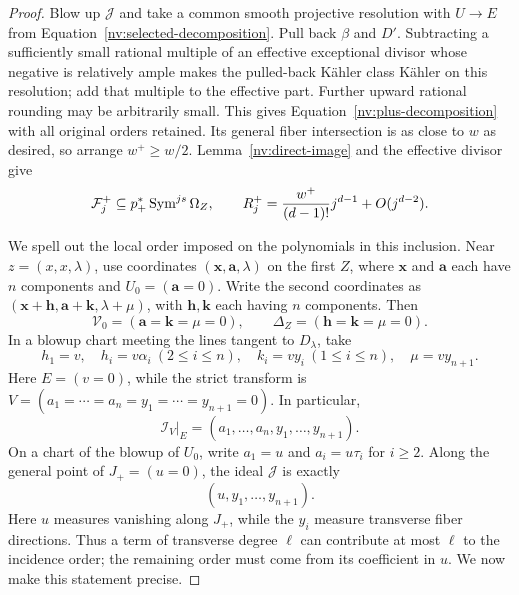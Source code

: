 \begin{proof}
Blow up \(\mathcal J\) and take a common smooth projective resolution
with \(U\to E\) from Equation~\eqref{nv:selected-decomposition}.  Pull back
\(\beta\) and \(D'\).  Subtracting a sufficiently small rational
multiple of an effective exceptional divisor whose negative is
relatively ample makes the pulled-back Kähler class Kähler on this
resolution; add that multiple to the effective part.  Further upward
rational rounding may be
arbitrarily small.  This gives Equation~\eqref{nv:plus-decomposition} with all
original orders retained.  Its general fiber intersection is as close
to \(w\) as desired, so arrange \(w^+\ge w/2\).  Lemma~\ref{nv:direct-image}
and the effective divisor give
\begin{equation}\label{nv:plus-rank}
 \mathcal F_j^+\subseteq p_+^*\operatorname{Sym}^{js}\Omega_Z,\qquad
 R_j^+=\frac{w^+}{(d-1)!}j^{d-1}+O(j^{d-2}).
\end{equation}

We spell out the local order imposed on the polynomials in this
inclusion.  Near \(z=(x,x,\lambda)\), use coordinates
\((\mathbf x,\mathbf a,\lambda)\) on the first \(Z\), where \(\mathbf x\)
and \(\mathbf a\) each have \(n\) components and \(U_0=(\mathbf a=0)\).
Write the second coordinates as
\((\mathbf x+\mathbf h,\mathbf a+\mathbf k,\lambda+\mu)\), with
\(\mathbf h,\mathbf k\) each having \(n\)
components.  Then
\[
 \mathcal V_0=(\mathbf a=\mathbf k=\mu=0),\qquad
 \Delta_Z=(\mathbf h=\mathbf k=\mu=0).
\]
In a blowup chart meeting the lines tangent to \(D_\lambda\), take
\[
 h_1=v,\quad h_i=v\alpha_i\ (2\le i\le n),\quad
 k_i=vy_i\ (1\le i\le n),\quad \mu=vy_{n+1}.
\]
Here \(E=(v=0)\), while the strict transform is
\(V=(a_1=\cdots=a_n=y_1=\cdots=y_{n+1}=0)\).
In particular,
\begin{equation}\label{nv:ideal-before}
 \mathcal I_V|_E=(a_1,\ldots,a_n,y_1,\ldots,y_{n+1}).
\end{equation}
On a chart of the blowup of \(U_0\), write
\(a_1=u\) and \(a_i=u\tau_i\) for \(i\ge2\).  Along the general point
of \(J_+=(u=0)\), the ideal \(\mathcal J\) is exactly
\begin{equation}\label{nv:joint-ideal}
 (u,y_1,\ldots,y_{n+1}).
\end{equation}
Here \(u\) measures vanishing along \(J_+\), while the \(y_i\) measure
transverse fiber directions.  Thus a term of transverse degree \(\ell\)
can contribute at most \(\ell\) to the incidence order; the remaining
order must come from its coefficient in \(u\).  We now make this statement
precise.


\end{proof}
